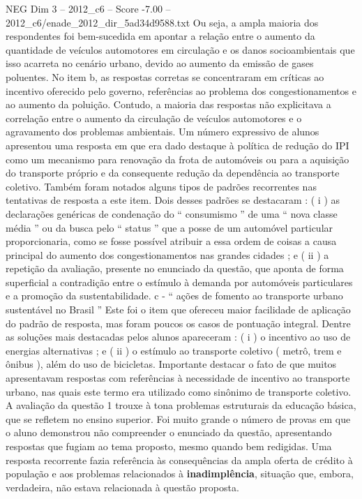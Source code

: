\begin{textsample}{NEG Dim 3 – 2012\_c6 – Score -7.00 – 2012\_c6/enade\_2012\_dir\_5ad34d9588.txt}
Ou seja, a ampla maioria dos respondentes foi bem-sucedida em apontar a relação entre o aumento da quantidade de veículos automotores em circulação e os danos socioambientais que isso acarreta no cenário urbano, devido ao aumento da emissão de gases poluentes.
No item b, as respostas corretas se concentraram em críticas ao incentivo oferecido pelo governo, referências ao problema dos congestionamentos e ao aumento da poluição.
Contudo, a maioria das respostas não explicitava a correlação entre o aumento da circulação de veículos automotores e o agravamento dos problemas ambientais.
Um número expressivo de alunos apresentou uma resposta em que era dado destaque à política de redução do IPI como um mecanismo para renovação da frota de automóveis ou para a aquisição do transporte próprio e da consequente redução da dependência ao transporte coletivo.
Também foram notados alguns tipos de padrões recorrentes nas tentativas de resposta a este item.
Dois desses padrões se destacaram : ( i ) as declarações genéricas de condenação do “ consumismo ” de uma “ nova classe média ” ou da busca pelo “ status ” que a posse de um automóvel particular proporcionaria, como se fosse possível atribuir a essa ordem de coisas a causa principal do aumento dos congestionamentos nas grandes cidades ; e ( ii ) a repetição da avaliação, presente no enunciado da questão, que aponta de forma superficial a contradição entre o estímulo à demanda por automóveis particulares e a promoção da sustentabilidade. c - “ ações de fomento ao transporte urbano sustentável no Brasil ” Este foi o item que ofereceu maior facilidade de aplicação do padrão de resposta, mas foram poucos os casos de pontuação integral.
Dentre as soluções mais destacadas pelos alunos apareceram : ( i ) o incentivo ao uso de energias alternativas ; e ( ii ) o estímulo ao transporte coletivo ( metrô, trem e ônibus ), além do uso de bicicletas.
Importante destacar o fato de que muitos apresentavam respostas com referências à necessidade de incentivo ao transporte urbano, nas quais este termo era utilizado como sinônimo de transporte coletivo.
A avaliação da questão 1 trouxe à tona problemas estruturais da educação básica, que se refletem no ensino superior.
Foi muito grande o número de provas em que o aluno demonstrou não compreender o enunciado da questão, apresentando respostas que fugiam ao tema proposto, mesmo quando bem redigidas.
Uma resposta recorrente fazia referência às consequências da ampla oferta de crédito à população e aos problemas relacionados à \textbf{inadimplência}, situação que, embora, verdadeira, não estava relacionada à questão proposta.

\end{textsample}
